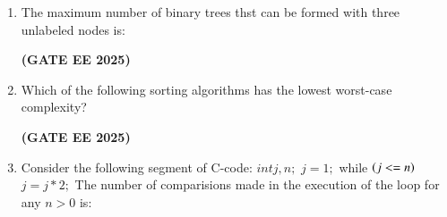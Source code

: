 \documentclass[journal,12pt,onecolumn]{IEEEtran}
\theoremstyle{remark}
\begin{document}
\begin {center}
\begin{enumerate}
\begin{enumerate}
\begin{multicols}{4}
\end{multicols}
\end{enumerate}
\hfill \textbf{(GATE EE 2025)}
\item    The maximum number of binary trees thst can be formed with three unlabeled nodes is:
\begin{enumerate}

\end{enumerate}
\hfill \textbf{(GATE EE 2025)}
\item    Which of the following sorting algorithms has the lowest worst-case complexity?
\begin{enumerate}


\end{enumerate}
\hfill \textbf{(GATE EE 2025)}
  
\item    Consider the following segment of C-code:
\newline
     $int j,n;$
     \newline
    $  j=1;$
    \newline
    while $\left(j<=n\right)$
    \newline
          $j=j*2;$
          \newline
The number of comparisions made in the execution of the loop for any $n>0$ is:
\begin{enumerate}
    

\end{enumerate}
\end{enumerate}
\end{center}
\end{document}
